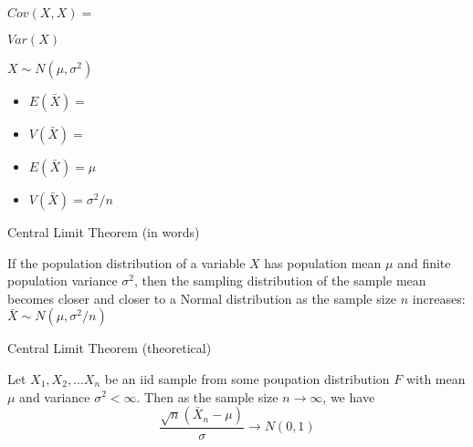 \documentclass[12pt]{article}
\begin{document}
\begin{note}
    \begin{field}
        $Cov(X,X) =$
    \end{field}
    \begin{field}
        $Var(X)$
    \end{field}
\end{note}

\begin{note}
    \begin{field}
        $X \sim N(\mu,\sigma^2)$
            \begin{itemize}
              \item $E(\bar{X}) = $
              \item $V(\bar{X}) = $
            \end{itemize}
    \end{field}
    \begin{field}
        \begin{itemize}
              \item $E(\bar{X}) = \mu$
              \item $V(\bar{X}) = \sigma^2/n$
            \end{itemize}
    \end{field}
\end{note}

\begin{note}
    \begin{field}
        Central Limit Theorem (in words)
    \end{field}
    \begin{field}
        If the population distribution of a variable $X$ has population mean $\mu$ and finite population variance $\sigma^2$, then the sampling distribution of the sample mean becomes closer and closer to a Normal distribution as the sample size $n$ increases: $\bar{X} \sim N(\mu,\sigma^2/n)$
    \end{field}
\end{note}

\begin{note}
    \begin{field}
        Central Limit Theorem (theoretical)
    \end{field}
    \begin{field}
        Let $X_1, X_2, \ldots X_n$ be an iid sample from some poupation distribution $F$ with mean $\mu$ and variance $\sigma^2 < \infty$. Then as the sample size $n \to \infty$, we have $$\frac{\sqrt{n}(\bar{X}_n - \mu)}{\sigma} \to N(0,1)$$
    \end{field}
\end{note}
\end{document}

